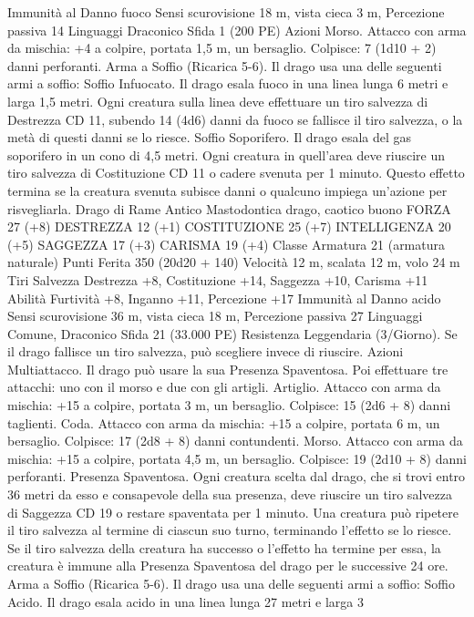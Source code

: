 \begin{multicols}{2}
Immunità al Danno fuoco
Sensi scurovisione 18 m, vista cieca 3 m, Percezione passiva 14
Linguaggi Draconico
Sfida 1 (200 PE)
Azioni
Morso. Attacco con arma da mischia: +4 a colpire, portata 1,5
m, un bersaglio.
Colpisce: 7 (1d10 + 2) danni perforanti.
Arma a Soffio (Ricarica 5-6). Il drago usa una delle seguenti armi
a soffio:
Soffio Infuocato. Il drago esala fuoco in una linea lunga 6 metri e
larga 1,5 metri. Ogni creatura sulla linea deve effettuare un tiro
salvezza di Destrezza CD 11, subendo 14 (4d6) danni da fuoco se
fallisce il tiro salvezza, o la metà di questi danni se lo riesce.
Soffio Soporifero. Il drago esala del gas soporifero in un cono di 4,5
metri. Ogni creatura in quell’area deve riuscire un tiro salvezza di
Costituzione CD 11 o cadere svenuta per 1 minuto. Questo effetto
termina se la creatura svenuta subisce danni o qualcuno impiega
un’azione per risvegliarla.
Drago di Rame Antico
Mastodontica drago, caotico buono
FORZA 27 (+8)
DESTREZZA 12 (+1)
COSTITUZIONE 25 (+7)
INTELLIGENZA 20 (+5)
SAGGEZZA 17 (+3)
CARISMA 19 (+4)
Classe Armatura 21 (armatura naturale)
Punti Ferita 350 (20d20 + 140)
Velocità 12 m, scalata 12 m, volo 24 m
Tiri Salvezza Destrezza +8, Costituzione +14, Saggezza +10,
Carisma +11
Abilità Furtività +8, Inganno +11, Percezione +17
Immunità al Danno acido
Sensi scurovisione 36 m, vista cieca 18 m, Percezione passiva 27
Linguaggi Comune, Draconico
Sfida 21 (33.000 PE)
Resistenza Leggendaria (3/Giorno). Se il drago fallisce un tiro
salvezza, può scegliere invece di riuscire.
Azioni
Multiattacco. Il drago può usare la sua Presenza Spaventosa. Poi
effettuare tre attacchi: uno con il morso e due con gli artigli.
Artiglio. Attacco con arma da mischia: +15 a colpire, portata 3
m, un bersaglio.
Colpisce: 15 (2d6 + 8) danni taglienti.
Coda. Attacco con arma da mischia: +15 a colpire, portata 6 m,
un bersaglio.
Colpisce: 17 (2d8 + 8) danni contundenti.
Morso. Attacco con arma da mischia: +15 a colpire, portata 4,5
m, un bersaglio.
Colpisce: 19 (2d10 + 8) danni perforanti.
Presenza Spaventosa. Ogni creatura scelta dal drago, che si trovi
entro 36 metri da esso e consapevole della sua presenza, deve
riuscire un tiro salvezza di Saggezza CD 19 o restare spaventata per
1 minuto. Una creatura può ripetere il tiro salvezza al termine di
ciascun suo turno, terminando l’effetto se lo riesce. Se il tiro salvezza
della creatura ha successo o l’effetto ha termine per essa, la creatura è
immune alla Presenza Spaventosa del drago per le successive 24 ore.
Arma a Soffio (Ricarica 5-6). Il drago usa una delle seguenti armi
a soffio:
Soffio Acido. Il drago esala acido in una linea lunga 27 metri e larga 3

\end{multicols}

